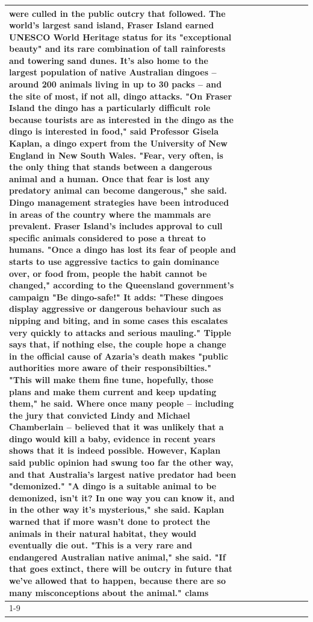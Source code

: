 \begin{table}[H]
\begin{tabular}{lllrlllll}
were culled in the public outcry that followed. The world's largest sand island, Fraser Island earned UNESCO World Heritage status for its "exceptional beauty" and its rare combination of tall rainforests and towering sand dunes. It's also home to the largest population of native Australian dingoes -- around 200 animals living in up to 30 packs -- and the site of most, if not all, dingo attacks. "On Fraser Island the dingo has a particularly difficult role because tourists are as interested in the dingo as the dingo is interested in food," said Professor Gisela Kaplan, a dingo expert from the University of New England in New South Wales. "Fear, very often, is the only thing that stands between a dangerous animal and a human. Once that fear is lost any predatory animal can become dangerous," she said. Dingo management strategies have been introduced in areas of the country where the mammals are prevalent. Fraser Island's includes approval to cull specific animals considered to pose a threat to humans. "Once a dingo has lost its fear of people and starts to use aggressive tactics to gain dominance over, or food from, people the habit cannot be changed," according to the Queensland government's campaign "Be dingo-safe!" It adds: "These dingoes display aggressive or dangerous behaviour such as nipping and biting, and in some cases this escalates very quickly to attacks and serious mauling." Tipple says that, if nothing else, the couple hope a change in the official cause of Azaria's death makes "public authorities more aware of their responsibilties." "This will make them fine tune, hopefully, those plans and make them current and keep updating them," he said. Where once many people -- including the jury that convicted Lindy and Michael Chamberlain -- believed that it was unlikely that a dingo would kill a baby, evidence in recent years shows that it is indeed possible. However, Kaplan said public opinion had swung too far the other way, and that Australia's largest native predator had been "demonized." "A dingo is a suitable animal to be demonized, isn't it? In one way you can know it, and in the other way it's mysterious," she said. Kaplan warned that if more wasn't done to protect the animals in their natural habitat, they would eventually die out. "This is a very rare and endangered Australian native animal," she said. "If that goes extinct, there will be outcry in future that we've allowed that to happen, because there are so many misconceptions about the animal." clams \\
\cline{1-9}

\end{tabular}
\end{table}
